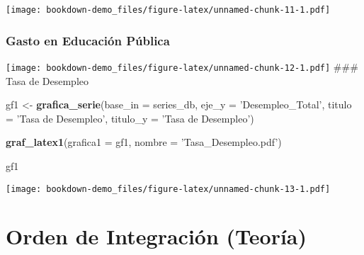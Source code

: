 \documentclass[]{book}
\newenvironment{Shaded}{\begin{snugshade}}{\end{snugshade}}
\newcommand{\KeywordTok}[1]{\textcolor[rgb]{0.13,0.29,0.53}{\textbf{#1}}}
\newcommand{\DataTypeTok}[1]{\textcolor[rgb]{0.13,0.29,0.53}{#1}}
\newcommand{\StringTok}[1]{\textcolor[rgb]{0.31,0.60,0.02}{#1}}
\newcommand{\NormalTok}[1]{#1}
\theoremstyle{definition}
\theoremstyle{definition}
\theoremstyle{definition}
\theoremstyle{remark}
\begin{document}
\texttt{[image: bookdown-demo\_files/figure-latex/unnamed-chunk-11-1.pdf]}

\subsection{Gasto en Educación
Pública}\label{gasto-en-educacion-publica}

\begin{Shaded}
\end{Shaded}

\texttt{[image: bookdown-demo\_files/figure-latex/unnamed-chunk-12-1.pdf]}
\#\#\# Tasa de Desempleo

\begin{Shaded}
\begin{Highlighting}[]
\NormalTok{gf1 <-}\StringTok{ }\KeywordTok{grafica_serie}\NormalTok{(}\DataTypeTok{base_in =}\NormalTok{ series_db, }
                      \DataTypeTok{eje_y =} \StringTok{'Desempleo_Total'}\NormalTok{, }
                      \DataTypeTok{titulo =} \StringTok{'Tasa de Desempleo'}\NormalTok{, }
                      \DataTypeTok{titulo_y =} \StringTok{'Tasa de Desempleo'}\NormalTok{)}

\KeywordTok{graf_latex1}\NormalTok{(}\DataTypeTok{grafica1 =}\NormalTok{ gf1,}
          \DataTypeTok{nombre =} \StringTok{'Tasa_Desempleo.pdf'}\NormalTok{)}

\NormalTok{gf1}
\end{Highlighting}
\end{Shaded}

\texttt{[image: bookdown-demo\_files/figure-latex/unnamed-chunk-13-1.pdf]}

\chapter{Orden de Integración
(Teoría)}\label{orden-de-integracion-teoria}
\end{document}

